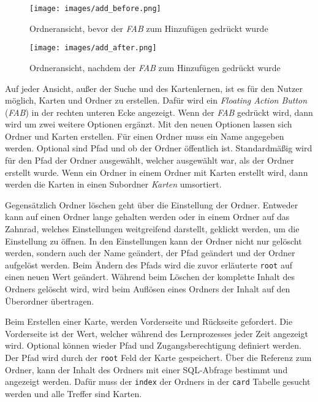 \begin{figure}[ht!]
  \centering
  \begin{minipage}[b]{0.4\textwidth}
    \texttt{[image: images/add\_before.png]}
    \caption{Ordneransicht, bevor der \textit{FAB} zum Hinzufügen gedrückt wurde}
    \label{add_before}
  \end{minipage}
  \hfill
  \begin{minipage}[b]{0.4\textwidth}
    \texttt{[image: images/add\_after.png]}
    \caption{Ordneransicht, nachdem der \textit{FAB} zum Hinzufügen gedrückt wurde}
  \end{minipage}
\end{figure}

Auf jeder Ansicht, außer der Suche und des Kartenlernen, ist es für den Nutzer möglich, Karten und Ordner zu erstellen. Dafür wird ein \textit{Floating Action Button} (\textit{FAB}) in der rechten unteren Ecke angezeigt. Wenn der \textit{FAB} gedrückt wird, dann wird um zwei weitere Optionen ergänzt. Mit den neuen Optionen lassen sich Ordner und Karten erstellen. Für einen Ordner muss ein Name angegeben werden. Optional sind Pfad und ob der Ordner öffentlich ist. Standardmäßig wird für den Pfad der Ordner ausgewählt, welcher ausgewählt war, als der Ordner erstellt wurde. Wenn ein Ordner in einem Ordner mit Karten erstellt wird, dann werden die Karten in einen Subordner \textit{Karten} umsortiert.

Gegensätzlich Ordner löschen geht über die Einstellung der Ordner. Entweder kann auf einen Ordner lange gehalten werden oder in einem Ordner auf das Zahnrad, welches Einstellungen weitgreifend darstellt, geklickt werden, um die Einstellung zu öffnen. In den Einstellungen kann der Ordner nicht nur gelöscht werden, sondern auch der Name geändert, der Pfad geändert und der Ordner aufgelöst werden. Beim Ändern des Pfads wird die zuvor erläuterte \texttt{root} auf einen neuen Wert geändert. Während beim Löschen der komplette Inhalt des Ordners gelöscht wird, wird beim Auflösen eines Ordners der Inhalt auf den Überordner übertragen. 

Beim Erstellen einer Karte, werden Vorderseite und Rückseite gefordert. Die Vorderseite ist der Wert, welcher während des Lernprozesses jeder Zeit angezeigt wird. Optional können wieder Pfad und Zugangsberechtigung definiert werden. Der Pfad wird durch der \texttt{root} Feld der Karte gespeichert. Über die Referenz zum Ordner, kann der Inhalt des Ordners mit einer SQL-Abfrage bestimmt und angezeigt werden. Dafür muss der \texttt{index} der Ordners in der \texttt{card} Tabelle gesucht werden und alle Treffer sind Karten.

